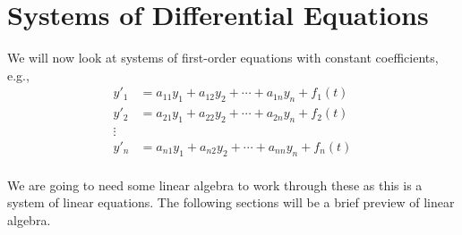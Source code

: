 \documentclass[letterpaper, 11pt, openany]{book}
\theoremstyle{mytheoremstyle}
\theoremstyle{myexamplestyle}
\begin{document}
\newpage\thispagestyle{firstofchapter}
\chapter{Systems of Differential Equations}
We will now look at systems of first-order equations with constant coefficients, e.g.,
\begin{align*}
    y'_{1} &= a_{11}y_{1} + a_{12}y_{2} + \cdots + a_{1n} y_{n} + f_{1}(t)\\
    y'_{2} &= a_{21}y_{1} + a_{22}y_{2} + \cdots + a_{2n} y_{n} + f_{2}(t)\\
    \vdots\\
    y'_{n} &= a_{n1}y_{1} + a_{n2}y_{2} + \cdots + a_{nn} y_{n} + f_{n}(t)\\
\end{align*}

We are going to need some linear algebra to work through these as this is a system of linear equations. The following sections will be a brief preview of linear algebra.

\end{document}
